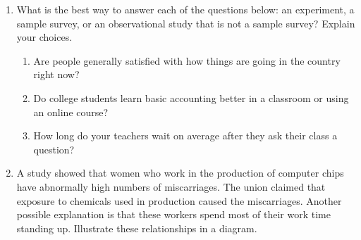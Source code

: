 \documentclass[10pt]{article}\usepackage[]{graphicx}\usepackage[]{color}
\newcommand{\ans}{\vspace{0.25in}}
\begin{document}
\begin{enumerate}
  \item What is the best way to answer each of the questions below: an experiment, a sample survey, or an observational study that is not a sample survey? Explain your choices.
  \begin{enumerate}
    \itemsep0.25in
    \item Are people generally satisfied with how things are going in the country right now?
    \item Do college students learn basic accounting better in a classroom or using an online course?
    \item How long do your teachers wait on average after they ask their class a question?
    \ans
  \end{enumerate}
  
  \item A study showed that women who work in the production of computer chips have abnormally high numbers of miscarriages. The union claimed that exposure to chemicals used in production caused the miscarriages. Another possible explanation is that these workers spend most of their work time standing up. Illustrate these relationships in a diagram.
  

\end{enumerate}
\end{document}
